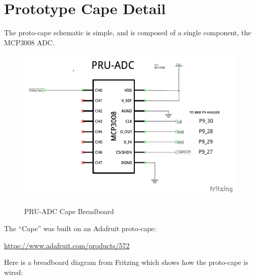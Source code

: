 %
%
%

\chapter{Prototype Cape Detail}




The proto-cape schematic is simple, and is composed of a single component, the MCP3008 ADC.

\begin{figure}[h]
	\centering
	\includegraphics{../../pcb/pru_adc_schematic_schem}
	\centering\bfseries
	\caption{PRU-ADC Cape Breadboard}
\end{figure}

The ``Cape'' was built on an Adafruit proto-cape:

\url{https://www.adafruit.com/products/572}

Here is a breadboard diagram from Fritzing which shows how the proto-cape
is wired:

